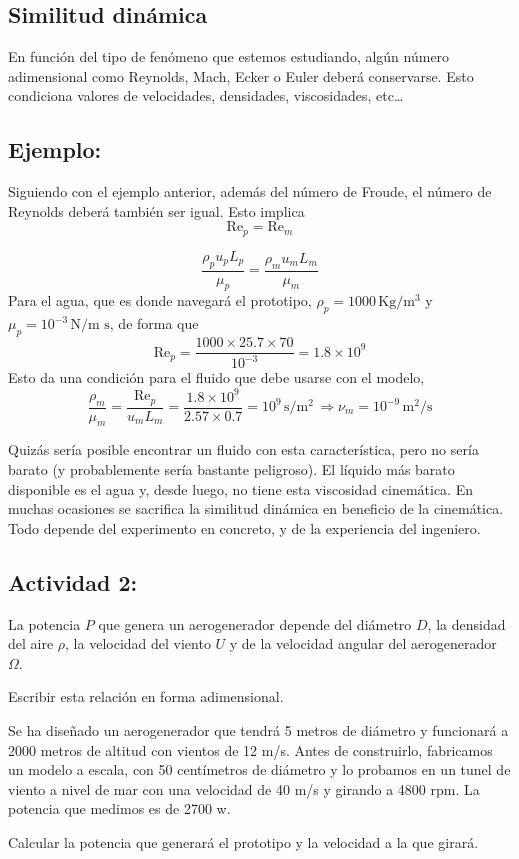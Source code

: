 \subsection{Similitud dinámica}
	
	
	En función del tipo de fenómeno que estemos estudiando, algún número
	adimensional como Reynolds, Mach, Ecker o Euler deberá conservarse.
	Esto condiciona valores de velocidades, densidades, viscosidades,
	etc\ldots{}
	\subsection*{Ejemplo:}
		Siguiendo con el ejemplo anterior, además del número de Froude, el
		número de Reynolds deberá también ser igual. Esto implica 
		\[
		\text{Re}_{p}=\text{Re}_{m}
		\]
		
		\[
		\frac{\rho_{p}u_{p}L_{p}}{\mu_{p}}=\frac{\rho_{m}u_{m}L_{m}}{\mu_{m}}
		\]
		Para el agua, que es donde navegará el prototipo, $\rho_{p}=1000\,\text{Kg}/\text{m}^{3}$
		y $\mu_{p}=10^{-3}\,\text{N}/\text{m s}$, de forma que 
		\[
		\text{Re}_{p}=\frac{1000\times25.7\times70}{10^{-3}}=1.8\times10^{9}
		\]
		Esto da una condición para el fluido que debe usarse con el modelo,
		\[
		\frac{\rho_{m}}{\mu_{m}}=\frac{\text{Re}_{p}}{u_{m}L_{m}}=\frac{1.8\times10^{9}}{2.57\times0.7}=10^{9}\,\text{s}/\text{m}^{2}\,\Rightarrow\nu_{m}=10^{-9}\,\text{m}^{2}/\text{s}
		\]
		
	
	Quizás sería posible encontrar un fluido con esta característica,
	pero no sería barato (y probablemente sería bastante peligroso). El
	líquido más barato disponible es el agua y, desde luego, no tiene
	esta viscosidad cinemática. En muchas ocasiones se sacrifica la similitud
	dinámica en beneficio de la cinemática. Todo depende del experimento
	en concreto, y de la experiencia del ingeniero.
	

	
	\subsection*{Actividad 2:}
		La potencia $P$ que genera un aerogenerador depende del diámetro
		$D$, la densidad del aire $\rho$, la velocidad del viento $U$ y
		de la velocidad angular del aerogenerador $\Omega$.
		
		Escribir esta relación en forma adimensional.
		
		Se ha diseñado un aerogenerador que tendrá 5 metros de diámetro y
		funcionará a 2000 metros de altitud con vientos de 12 m/s. Antes de
		construirlo, fabricamos un modelo a escala, con 50 centímetros de
		diámetro y lo probamos en un tunel de viento a nivel de mar con una
		velocidad de 40 m/s y girando a 4800 rpm. La potencia que medimos
		es de 2700 w.
		
		Calcular la potencia que generará el prototipo y la velocidad a la
		que girará. 


